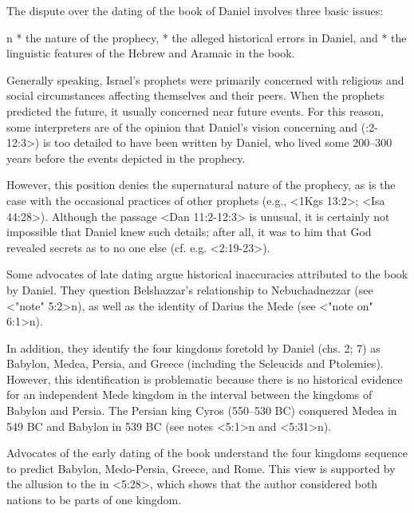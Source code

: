  
The dispute over the dating of the book of Daniel involves three basic issues:

\begitems\style n
* the nature of the prophecy,
* the alleged historical errors in Daniel, and 
* the linguistic features of the Hebrew and Aramaic in the book.
\enditems

Generally speaking, Israel's prophets were primarily concerned with religious and social circumstances affecting themselves and their peers. When the prophets predicted the future, it usually concerned near future events.
For this reason, some interpreters are of the opinion that Daniel's vision concerning  and  (:2-12:3>) is too detailed to have been written by Daniel, who lived some 200--300 years before the events depicted in the prophecy.

However, this position denies the supernatural nature of the prophecy, as is the case with the occasional practices of other prophets (e.g., <1Kgs 13:2>; <Isa 44:28>). Although the passage <Dan 11:2-12:3> is unusual, it is certainly not impossible that Daniel knew such details; after all, it was to him that God revealed secrets as to no one else (cf. e.g. <2:19-23>).  



Some advocates of late dating argue historical inaccuracies attributed to the book by Daniel.
They question Belshazzar's relationship to Nebuchadnezzar %
(see <"note" 5:2>n), as well as the identity of Darius the Mede (see <"note on" 6:1>n). 

In addition, they identify the four kingdoms foretold by Daniel (chs. 2; 7) as Babylon, Medea, Persia, and Greece (including the Seleucids and Ptolemies). However, this identification is problematic because there is no historical evidence for an independent Mede kingdom in the interval between the kingdoms of Babylon and Persia.
The Persian king Cyros (550--530 BC) conquered Medea in 549 BC and Babylon in 539 BC (see notes <5:1>n and <5:31>n).

Advocates of the early dating of the book understand the four kingdoms sequence to predict Babylon, Medo-Persia, Greece, and Rome. 
This view is supported by the allusion to the  in <5:28>, which shows that the author considered both nations to be parts of one kingdom.





